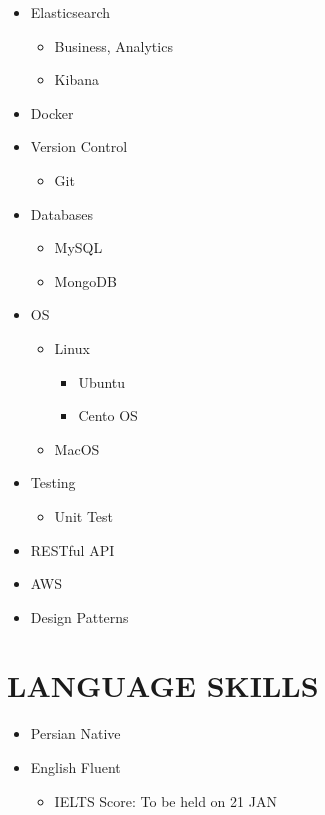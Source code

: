 \documentclass[10pt,a4paper,sans]{moderncv} %
\begin{document}
\begin{itemize}
\begin{multicols}{2}
			\begin{itemize}
				\item Elasticsearch
				\begin{itemize}
					\item Business, Analytics
					\item Kibana
				\end{itemize}
				\item Docker
				\item Version Control
				\begin{itemize}
					\item Git
				\end{itemize}
				\item Databases
				\begin{itemize}
					\item MySQL
					\item MongoDB
				\end{itemize}
				\item OS
				\begin{itemize}
					\item Linux
						\begin{itemize}
							\item Ubuntu
							\item Cento OS
						\end{itemize}
					\item MacOS
				\end{itemize}
				\item Testing
				\begin{itemize}
					\item Unit Test
				\end{itemize}
				\item RESTful API
				\item AWS
				\item Design Patterns
			\end{itemize}		
		\end{multicols}
	\end{itemize}
	
	\section{LANGUAGE SKILLS}
	
	\begin{itemize}
	\item Persian \hspace{5 pt} Native
	\item English \hspace{6 pt} Fluent   
		\begin{itemize}
			 \item IELTS Score: To be held on 21 JAN
		\end{itemize}
	\end{itemize} 
	
\end{document}
